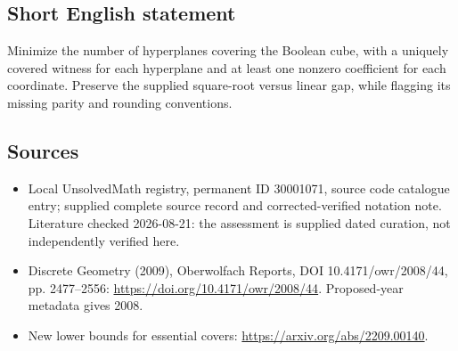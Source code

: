 \documentclass[11pt]{article}
\begin{document}
\subsection{Short English statement}
Minimize the number of hyperplanes covering the Boolean cube, with a uniquely covered witness for each hyperplane and at least one nonzero coefficient for each coordinate. Preserve the supplied square-root versus linear gap, while flagging its missing parity and rounding conventions.
\subsection{Sources}
\begin{itemize}
\item Local UnsolvedMath registry, permanent ID 30001071, source code catalogue entry; supplied complete source record and corrected-verified notation note. Literature checked 2026-08-21: the assessment is supplied dated curation, not independently verified here.
\item Discrete Geometry (2009), Oberwolfach Reports, DOI 10.4171/owr/2008/44, pp. 2477--2556: \url{https://doi.org/10.4171/owr/2008/44}. Proposed-year metadata gives 2008.
\item New lower bounds for essential covers: \url{https://arxiv.org/abs/2209.00140}.
\end{itemize}
\end{document}
